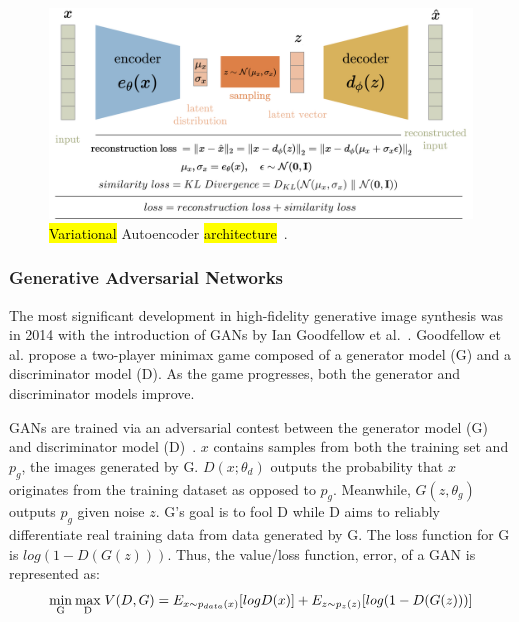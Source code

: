 \documentclass[technologies,article,accept,pdftex,moreauthors]{Definitions/mdpi}
\begin{document}
\begin{figure}[H]
    \includegraphics[width=.99\columnwidth]{vae.png}
    \caption{\label{fig:vae}\hl{Variational} %
 Autoencoder \hl{architecture}~\cite{rocca_2021}.}
\end{figure}

\subsubsection{Generative Adversarial Networks}
\label{VG}
The most significant development in high-fidelity generative image synthesis was in 2014 with the introduction of  GANs by Ian Goodfellow et al.~\cite{goodfellow2014generative}. Goodfellow et al. propose a two-player minimax game composed of a generator model (G) and a discriminator model (D). As the game progresses, both the generator and discriminator models improve.


GANs are trained via an adversarial contest between the generator model (G) and discriminator model (D)~\cite{goodfellow2014generative}. $x$ contains samples from both the training set and $p_g$, the images generated by G. $D(x;\theta_d)$ outputs the probability that $x$ originates from the training dataset as opposed to $p_g$. Meanwhile, $G(z, \theta_g)$ outputs $p_g$ given noise $z$. G's goal is to fool D while D aims to reliably differentiate real training data from data generated by G. The loss function for G is $log(1 - D(G(z)))$. Thus, the value/loss function, error, of a GAN is represented as:
\begin{equation}
\mathrm{\underset{G}{min} \:\underset{D}{max} } \;V (D, G) = E_{x\sim p_{data}(x)} [log D(x)] \\
+ E_{z\sim p_{z}(z)} [log(1 - D(G(z)))]
\end{equation}  
\vspace{-12pt}
\end{document}
